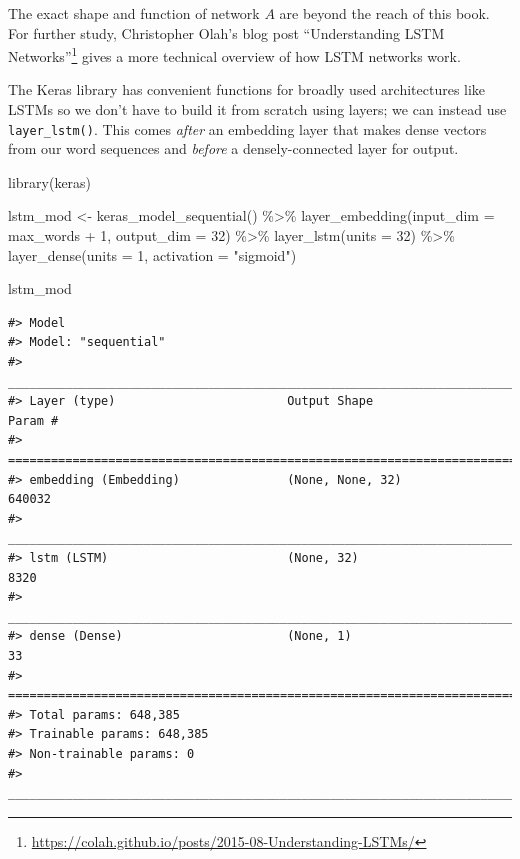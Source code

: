 \documentclass[
]{krantz}
\makeatletter
\newenvironment{Shaded}{\begin{snugshade}}{\end{snugshade}}
\newcommand{\AttributeTok}[1]{\textcolor[rgb]{0.77,0.63,0.00}{#1}}
\newcommand{\DecValTok}[1]{\textcolor[rgb]{0.00,0.00,0.81}{#1}}
\newcommand{\FunctionTok}[1]{\textcolor[rgb]{0.00,0.00,0.00}{#1}}
\newcommand{\NormalTok}[1]{#1}
\newcommand{\OtherTok}[1]{\textcolor[rgb]{0.56,0.35,0.01}{#1}}
\newcommand{\SpecialCharTok}[1]{\textcolor[rgb]{0.00,0.00,0.00}{#1}}
\newcommand{\StringTok}[1]{\textcolor[rgb]{0.31,0.60,0.02}{#1}}
\DeclareRobustCommand{\href}[2]{#2\footnote{\url{#1}}}
\renewcommand{\href}[2]{#2\footnote{\url{#1}}}
\newenvironment{kframe}{%
\medskip{}
\setlength{\fboxsep}{.8em}
 \def\at@end@of@kframe{}%
 \ifinner\ifhmode%
  \def\at@end@of@kframe{\end{minipage}}%
  \begin{minipage}{\columnwidth}%
 \fi\fi%
 \def\FrameCommand##1{\hskip\@totalleftmargin \hskip-\fboxsep
 \colorbox{shadecolor}{##1}\hskip-\fboxsep
     \hskip-\linewidth \hskip-\@totalleftmargin \hskip\columnwidth}%
 \MakeFramed {\advance\hsize-\width
   \@totalleftmargin\z@ \linewidth\hsize
   \@setminipage}}%
 {\par\unskip\endMakeFramed%
 \at@end@of@kframe}
\renewenvironment{Shaded}{\begin{kframe}}{\end{kframe}}
\makeatother
\begin{document}
The exact shape and function of network \(A\) are beyond the reach of this book. For further study, Christopher Olah's blog post \href{https://colah.github.io/posts/2015-08-Understanding-LSTMs/}{``Understanding LSTM Networks''} gives a more technical overview of how LSTM networks work.

The Keras library has convenient functions for broadly used architectures like LSTMs so we don't have to build it from scratch using layers; we can instead use \texttt{layer\_lstm()}. This comes \emph{after} an embedding layer that makes dense vectors from our word sequences and \emph{before} a densely-connected layer for output.

\begin{Shaded}
\begin{Highlighting}[]
\FunctionTok{library}\NormalTok{(keras)}

\NormalTok{lstm\_mod }\OtherTok{\textless{}{-}} \FunctionTok{keras\_model\_sequential}\NormalTok{() }\SpecialCharTok{\%\textgreater{}\%}
  \FunctionTok{layer\_embedding}\NormalTok{(}\AttributeTok{input\_dim =}\NormalTok{ max\_words }\SpecialCharTok{+} \DecValTok{1}\NormalTok{, }\AttributeTok{output\_dim =} \DecValTok{32}\NormalTok{) }\SpecialCharTok{\%\textgreater{}\%}
  \FunctionTok{layer\_lstm}\NormalTok{(}\AttributeTok{units =} \DecValTok{32}\NormalTok{) }\SpecialCharTok{\%\textgreater{}\%}
  \FunctionTok{layer\_dense}\NormalTok{(}\AttributeTok{units =} \DecValTok{1}\NormalTok{, }\AttributeTok{activation =} \StringTok{"sigmoid"}\NormalTok{)}

\NormalTok{lstm\_mod}
\end{Highlighting}
\end{Shaded}

\begin{verbatim}
#> Model
#> Model: "sequential"
#> ________________________________________________________________________________
#> Layer (type)                        Output Shape                    Param #     
#> ================================================================================
#> embedding (Embedding)               (None, None, 32)                640032      
#> ________________________________________________________________________________
#> lstm (LSTM)                         (None, 32)                      8320        
#> ________________________________________________________________________________
#> dense (Dense)                       (None, 1)                       33          
#> ================================================================================
#> Total params: 648,385
#> Trainable params: 648,385
#> Non-trainable params: 0
#> ________________________________________________________________________________
\end{verbatim}
\end{document}
